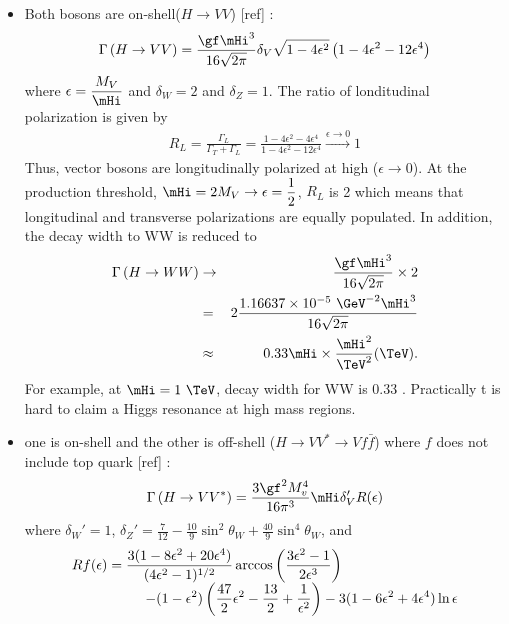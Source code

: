 \begin{itemize} 
%
\item  Both bosons are on-shell($ H \rightarrow VV$) [ref] : 
\begin{eqnarray} 
\Gamma \left( H \rightarrow VV \right) 
= 
\frac{\gf \mHi^3}{16\sqrt{2\pi}} \delta_V \sqrt{1-4\epsilon^2} 
\left( 1 - 4\epsilon^2 - 12\epsilon^4 \right)
\end{eqnarray} 
where $\displaystyle \epsilon = \frac{M_V}{\mHi}$ and $\delta_W=2$ and $\delta_Z=1$.
The ratio of londitudinal polarization is given by \cite{PhysRevD.49.79}
\begin{eqnarray} 
R_L 
= 
\frac{\Gamma_L}{\Gamma_T + \Gamma_L}    
= 
\frac{1 - 4\epsilon^2 - 4\epsilon^4}{1 - 4\epsilon^2 - 12\epsilon^4} 
\xrightarrow{\epsilon \rightarrow 0}{} 1
\end{eqnarray} 
Thus, vector bosons are longitudinally polarized at high \mHi{} ($\epsilon \rightarrow 0$). 
At the production threshold, $\displaystyle \mHi = 2M_V \rightarrow \epsilon = \frac{1}{2}$, 
$R_L$ is 2 which means that longitudinal and transverse polarizations are equally populated. 
In addition, the decay width to WW is reduced to 
\begin{eqnarray} 
\Gamma \left( H \rightarrow WW \right)
&\rightarrow&
\frac{\gf \mHi^3}{16\sqrt{2\pi}} \times 2 \\
&=&  
2 \frac{ 1.16637 \times 10^{-5}~\GeV^{-2} \mHi^3}{16\sqrt{2\pi}} \\
&\approx&
0.33 \mHi \times \frac{\mHi^2}{\TeV^2} (\TeV).   
\end{eqnarray} 
For example, at $\mHi=1~\TeV$, decay width for WW is 0.33 \TeV.
Practically t is hard to claim a Higgs resonance at high mass regions.  
%
\item  one is on-shell and the other is off-shell 
       ($ H \rightarrow VV^* \rightarrow Vf\bar{f}$) where $f$ does not include top quark [ref] : 
\begin{eqnarray} 
\Gamma \left( H \rightarrow VV^* \right) 
=
\frac{3\gf^2 M_v^4}{16\pi^3} \mHi \delta_V' R(\epsilon)
\end{eqnarray} 
where $\delta_W'=1$, $\displaystyle \delta_Z'=\frac{7}{12}-\frac{10}{9}\sin^2\theta_W 
+ \frac{40}{9}\sin^4\theta_W$, and 
\begin{eqnarray}   
\begin{array}{ccc} \multicolumn{2}{c}{\displaystyle 
Rf(\epsilon) = \frac{3(1-8\epsilon^2+20\epsilon^4)}{(4\epsilon^2-1)^{1/2}} 
                \arccos \left( \frac{3\epsilon^2-1}{2\epsilon^3} \right)  
} & \\ & \multicolumn{2}{c}{\hspace{1.5cm} \displaystyle
- (1-\epsilon^2)\left( \frac{47}{2}\epsilon^2 - \frac{13}{2} + \frac{1}{\epsilon^2} \right)  
- 3(1-6\epsilon^2+4\epsilon^4) \ln \epsilon
} \end{array}      
\end{eqnarray} 
\end{itemize} 
